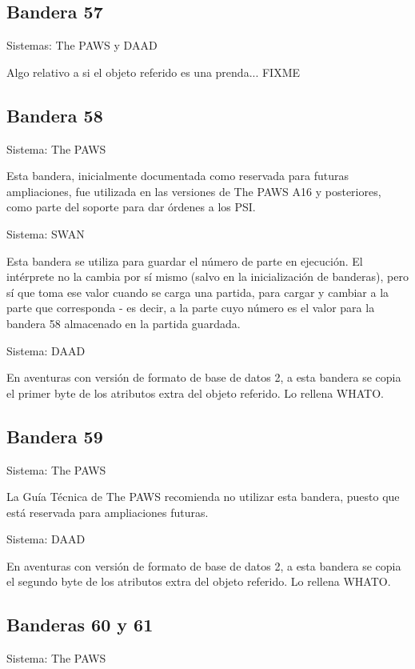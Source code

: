 \documentclass[11pt, a5paper]{article}
\newcommand{\paw}{\textsf{The PAWS}\xspace}
\newcommand{\swan}{\textsf{SWAN}\xspace}
\newcommand{\daad}{\textsf{DAAD}\xspace}
\newcommand{\sistema}[1]{\noindent Sistema: #1 \nopagebreak}
\newcommand{\sistemas}[1]{\noindent Sistemas: #1 \nopagebreak}
\begin{document}
\subsection{Bandera 57}

\sistemas{\paw y \daad}

Algo relativo a si el objeto referido es una prenda... FIXME

\subsection{Bandera 58}

\sistema{\paw}

Esta bandera, inicialmente documentada como reservada para futuras ampliaciones, fue utilizada en las versiones de \paw A16 y posteriores, como parte del soporte para dar órdenes a los PSI. \cite{PawsSupl}

\sistema{\swan}

Esta bandera se utiliza para guardar el número de parte en ejecución. El intérprete no la cambia por sí mismo (salvo en la inicialización de banderas), pero sí que toma ese valor cuando se carga una partida, para cargar y cambiar a la parte que corresponda - es decir, a la parte cuyo número es el valor para la bandera 58 almacenado en la partida guardada.

\sistema{\daad}

En aventuras con versión de formato de base de datos 2, a esta bandera se copia el primer byte de los atributos extra del objeto referido. Lo rellena WHATO.

\subsection{Bandera 59}

\sistema{\paw}

La Guía Técnica de \paw \cite{PawsZX} recomienda no utilizar esta bandera, puesto que está reservada para ampliaciones futuras.

\sistema{\daad}

En aventuras con versión de formato de base de datos 2, a esta bandera se copia el segundo byte de los atributos extra del objeto referido. Lo rellena WHATO.

\subsection{Banderas 60 y 61}

\sistema{\paw}
\end{document}
